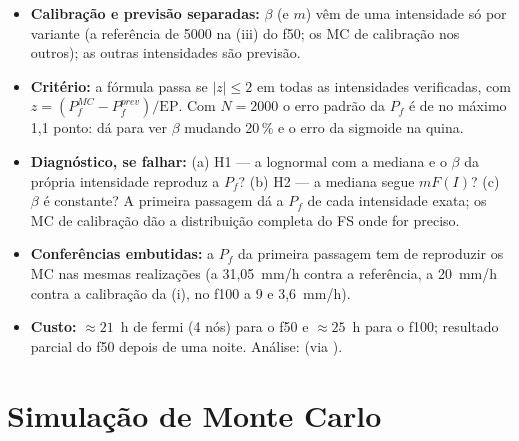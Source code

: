 \documentclass[11pt,a4paper]{article}
\newcommand{\Pf}{P_f}
\begin{document}
\begin{itemize}
  \item \textbf{Calibração e previsão separadas:} $\beta$ (e $m$) vêm de uma intensidade só por variante (a referência
    de 5000 na (iii) do f50; os MC de calibração nos outros); as outras intensidades são previsão.
  \item \textbf{Critério:} a fórmula passa se $|z| \le 2$ em todas as intensidades verificadas, com $z = (\Pf^{MC} -
    \Pf^{prev})/\mathrm{EP}$. Com $N = 2000$ o erro padrão da $\Pf$ é de no máximo 1,1 ponto: dá para ver $\beta$
    mudando 20\,\% e o erro da sigmoide na quina.
  \item \textbf{Diagnóstico, se falhar:} (a) H1 --- a lognormal com a mediana e o $\beta$ da própria intensidade
    reproduz a $\Pf$? (b) H2 --- a mediana segue $mF(I)$? (c) $\beta$ é constante? A primeira passagem dá a $\Pf$ de
    cada intensidade exata; os MC de calibração dão a distribuição completa do FS onde for preciso.
  \item \textbf{Conferências embutidas:} a $\Pf$ da primeira passagem tem de reproduzir os MC nas mesmas realizações (a
    31,05~mm/h contra a referência, a 20~mm/h contra a calibração da (i), no f100 a 9 e 3,6~mm/h).
  \item \textbf{Custo:} $\approx 21$~h de fermi (4 nós) para o f50 e $\approx 25$~h para o f100; resultado parcial do
    f50 depois de uma noite. Análise:  (via ).
\end{itemize}

\section{Simulação de Monte Carlo}\label{sec:mc}
\providecommand{\mcFormBetaA}{--}\providecommand{\mcFormPfA}{--}\providecommand{\mcFormBetaB}{--}
\providecommand{\mcFormPfB}{--}\providecommand{\mcFragPfA}{--}\providecommand{\mcFragPfB}{--}
\providecommand{\fragZkiii}{--}\providecommand{\fragZkDentroiii}{--}\providecommand{\fragZmiii}{--}
\providecommand{\fragPariii}{--}\providecommand{\fragBetaiii}{--}\providecommand{\fragMkiii}{--}
\providecommand{\fragIcaliii}{--}\providecommand{\fragTopIiii}{--}\providecommand{\fragCensMediii}{--}
\providecommand{\fragCensMedSeiii}{--}\providecommand{\fragCensBetaiii}{--}\providecommand{\fragCensBetaSeiii}{--}
\providecommand{\fragPrevMediii}{--}\providecommand{\fragZki}{--}\providecommand{\fragZkDentroi}{--}
\providecommand{\fragZmi}{--}\providecommand{\fragPari}{--}\providecommand{\fragBetai}{--}\providecommand{\fragMki}{--}
\providecommand{\fragIcali}{--}\providecommand{\fragTemi}{0}\providecommand{\fragTemiii}{0}
\providecommand{\fragZmMaxi}{--}\providecommand{\fragZmDentroi}{--}\providecommand{\fragTopIi}{--}
\providecommand{\fragCensMedi}{--}\providecommand{\fragCensMedSei}{--}\providecommand{\fragCensBetai}{--}
\providecommand{\fragCensBetaSei}{--}\providecommand{\fragPrevMedi}{--}\providecommand{\fragPrevMedMedioi}{--}
\providecommand{\fragCemTem}{0}
\end{document}
